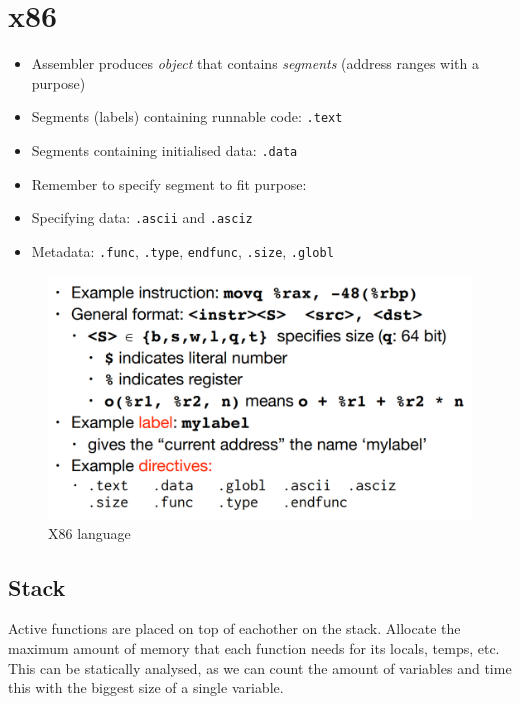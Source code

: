 \section{x86}

\begin{itemize}
    \item Assembler produces \textit{object} that contains \textit{segments} (address ranges with a purpose)
    \item Segments (labels) containing runnable code: \texttt{.text}
    \item Segments containing initialised data: \texttt{.data}
    \item Remember to specify segment to fit purpose:
    \item Specifying data: \texttt{.ascii} and \texttt{.asciz}
    \item Metadata: \texttt{.func}, \texttt{.type}, \texttt{endfunc}, \texttt{.size}, \texttt{.globl}
\end{itemize}

\begin{figure}[h]
    \centering
    \includegraphics[scale=0.3]{assets/x86.PNG}
    \caption{X86 language}
    \label{fig:x86}
\end{figure}

\subsection{Stack}

Active functions are placed on top of eachother on the stack. Allocate the maximum amount of memory that each function needs for its locals, temps, etc.\\

This can be statically analysed, as we can count the amount of variables and time this with the biggest size of a single variable.\\

